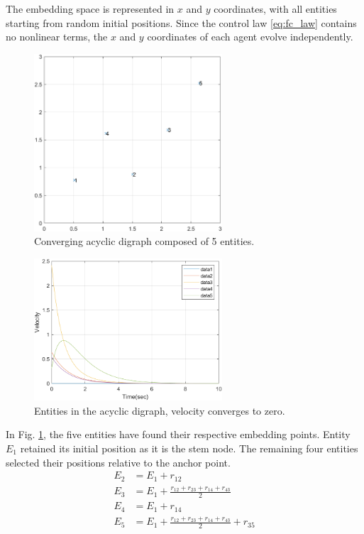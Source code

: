 \documentclass[letterpaper, 10 pt, conference]{ieeeconf}  %
\begin{document}
The embedding space is represented in $x$ and $y$ coordinates, with all entities starting from random initial positions. Since the control law \eqref{eq:fc_law} contains no nonlinear terms, the $x$ and $y$ coordinates of each agent evolve independently. %

\begin{figure}[thb]
\begin{center}
\includegraphics[width=7cm]{IMG/AG_simul3.png}
\caption{Converging acyclic digraph composed of 5 entities.}
\label{fig:DAGstate}
\end{center}
\vspace{-3mm}
\end{figure}

\begin{figure}[thb]
\begin{center}
\includegraphics[width=7cm]{IMG/DAGvelocity.png}
\caption{Entities in the acyclic digraph, velocity converges to zero.}
\label{fig:DAGvelocity}
\end{center}
\vspace{-0mm}
\end{figure}

In Fig. \ref{fig:DAGstate}, the five entities have found their respective embedding points. Entity \(E_1\) retained its initial position as it is the stem node. The remaining four entities selected their positions relative to the anchor point.
\begin{equation}\label{eq:result1}
\begin{split}
    E_2 &= E_1 + r_{12}\\
    E_3 &= E_1 + \frac{r_{12}+r_{23}+r_{14}+r_{43}}{2}\\
    E_4 &= E_1 + r_{14}\\
    E_5 &= E_1 + \frac{r_{12}+r_{23}+r_{14}+r_{43}}{2} + r_{35}
\end{split}
\end{equation}
\end{document}
